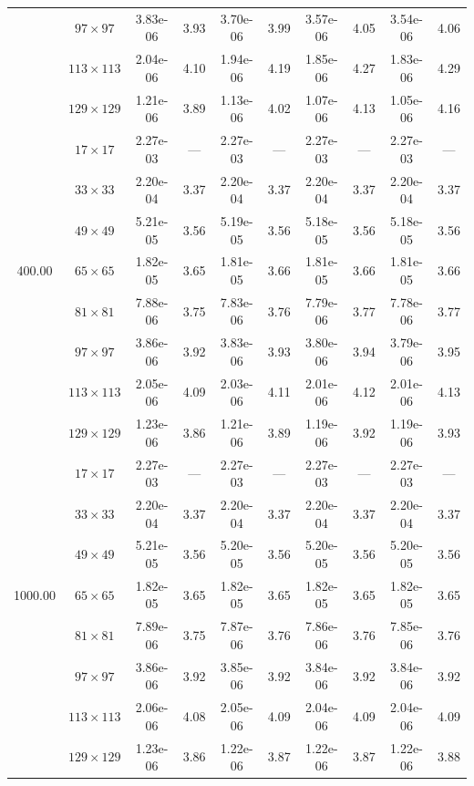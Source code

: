 \documentclass[preprint, 12pt]{elsarticle}
\begin{document}
\begin{center}
\begin{table}[H]
{\begin{tabular*}{\textwidth}{@{\extracolsep\fill}cccccccccc@{}}
    & $97\times 97$ & 3.83e-06 & 3.93 & 3.70e-06 & 3.99 & 3.57e-06 & 4.05 & 3.54e-06 & 4.06 \\
    & $113\times 113$ & 2.04e-06 & 4.10 & 1.94e-06 & 4.19 & 1.85e-06 & 4.27 & 1.83e-06 & 4.29 \\
    & $129\times 129$ & 1.21e-06 & 3.89 & 1.13e-06 & 4.02 & 1.07e-06 & 4.13 & 1.05e-06 & 4.16 \\
    \hline
    \multirow{7}{*}{400.00} & $17\times 17$ & 2.27e-03 & --- & 2.27e-03 & --- & 2.27e-03 & --- & 2.27e-03 & --- \\
    & $33\times 33$ & 2.20e-04 & 3.37 & 2.20e-04 & 3.37 & 2.20e-04 & 3.37 & 2.20e-04 & 3.37 \\
    & $49\times 49$ & 5.21e-05 & 3.56 & 5.19e-05 & 3.56 & 5.18e-05 & 3.56 & 5.18e-05 & 3.56 \\
    & $65\times 65$ & 1.82e-05 & 3.65 & 1.81e-05 & 3.66 & 1.81e-05 & 3.66 & 1.81e-05 & 3.66 \\
    & $81\times 81$ & 7.88e-06 & 3.75 & 7.83e-06 & 3.76 & 7.79e-06 & 3.77 & 7.78e-06 & 3.77 \\
    & $97\times 97$ & 3.86e-06 & 3.92 & 3.83e-06 & 3.93 & 3.80e-06 & 3.94 & 3.79e-06 & 3.95 \\
    & $113\times 113$ & 2.05e-06 & 4.09 & 2.03e-06 & 4.11 & 2.01e-06 & 4.12 & 2.01e-06 & 4.13 \\
    & $129\times 129$ & 1.23e-06 & 3.86 & 1.21e-06 & 3.89 & 1.19e-06 & 3.92 & 1.19e-06 & 3.93 \\
    \hline
    \multirow{7}{*}{1000.00} & $17\times 17$ & 2.27e-03 & --- & 2.27e-03 & --- & 2.27e-03 & --- & 2.27e-03 & --- \\
    & $33\times 33$ & 2.20e-04 & 3.37 & 2.20e-04 & 3.37 & 2.20e-04 & 3.37 & 2.20e-04 & 3.37 \\
    & $49\times 49$ & 5.21e-05 & 3.56 & 5.20e-05 & 3.56 & 5.20e-05 & 3.56 & 5.20e-05 & 3.56 \\
    & $65\times 65$ & 1.82e-05 & 3.65 & 1.82e-05 & 3.65 & 1.82e-05 & 3.65 & 1.82e-05 & 3.65 \\
    & $81\times 81$ & 7.89e-06 & 3.75 & 7.87e-06 & 3.76 & 7.86e-06 & 3.76 & 7.85e-06 & 3.76 \\
    & $97\times 97$ & 3.86e-06 & 3.92 & 3.85e-06 & 3.92 & 3.84e-06 & 3.92 & 3.84e-06 & 3.92 \\
    & $113\times 113$ & 2.06e-06 & 4.08 & 2.05e-06 & 4.09 & 2.04e-06 & 4.09 & 2.04e-06 & 4.09 \\
    & $129\times 129$ & 1.23e-06 & 3.86 & 1.22e-06 & 3.87 & 1.22e-06 & 3.87 & 1.22e-06 & 3.88 \\
    \hline
    \end{tabular*}
}
\end{table}
\end{center}
\end{document}
